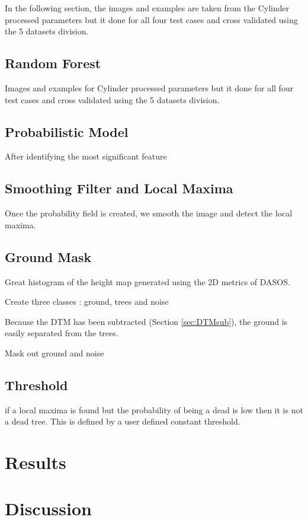\documentclass{subfiles}
\begin{document}
	\par In the following section, the images and examples are taken from the Cylinder processed parameters but it done for all four test cases and cross validated using the 5 datasets division.




\subsection{Random Forest}
	\par Images and examples for Cylinder processed parameters but it done for all four test cases and cross validated using the 5 datasets division.
	
\subsection{Probabilistic Model}

 \par After identifying the most significant feature
 
 
 \subsection{Smoothing Filter and Local Maxima}
 
 \par Once the probability field is created, we smooth the image and detect the local maxima.
 
 \subsection{Ground Mask}
 
 \par Great histogram of the height map generated using the 2D metrics of DASOS. 
 
 \par Create three classes : ground, trees and noise
 
 \par Because the DTM has been subtracted (Section \ref{sec:DTMsub}), the ground is easily separated from the trees. 
 
 \par Mask out  ground and noise
 
 \subsection{Threshold}
 
 \par if a local maxima is found but the probability of being a dead is low then it is not a dead tree. This is defined by a user defined constant threshold. 
 


\section{Results} 

		
		
\section{Discussion}
\end{document}
